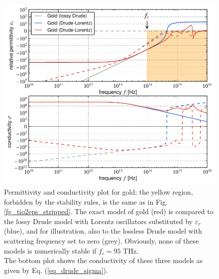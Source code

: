 \begin{figure}[t] \caption{Permittivity and conductivity plot for gold; the yellow region, forbidden by the stability rules, is the same as in Fig. \ref{fg_tio2eps_stripped}. The exact model of gold \cite{rakic1998optical} 
(red) is compared to the lossy Drude model with Lorentz oscillators substituted by $\varepsilon_r$ (blue), and for illustration, also to the lossless Drude model with scattering frequency set to zero (grey). Obviously, none of these models is numerically stable if $f_c = 95$ THz.
\\The bottom plot shows the conductivity of these three models as given by Eq. (\ref{eq_drude_sigma}).}
\label{fg_Au_models} \centering 
	\includegraphics[width=14cm]{img/epsilon_Au_models_llgrey.pdf} %
\end{figure}


